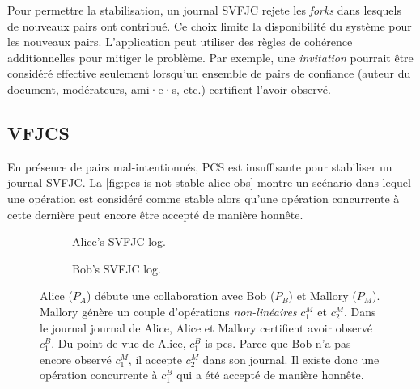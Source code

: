 Pour permettre la stabilisation, un journal \ac{SVFJC} rejete les \emph{forks} dans lesquels de nouveaux pairs ont contribué.
Ce choix limite la disponibilité du système pour les nouveaux pairs.
L'application peut utiliser des règles de cohérence additionnelles pour mitiger le problème.
Par exemple, une \emph{invitation} pourrait être considéré effective seulement lorsqu'un ensemble de pairs de confiance (auteur du document, modérateurs, ami·e·s, etc.) certifient l'avoir observé.

\subsection{\acl{VFJCS}}\label{subsec:vfjcs}

En présence de pairs mal-intentionnés, \acl{PCS} est insuffisante pour stabiliser un journal \ac{SVFJC}.
La \autoref{fig:pcs-is-not-stable-alice-obs} montre un scénario dans lequel une opération est considéré comme stable alors qu'une opération concurrente à cette dernière peut encore être accepté de manière honnête.

\begin{figure}[ht]
  \centering
  \begin{subfigure}{\linewidth}
    \centering
    \begin{utikzhbgraph}
    \end{utikzhbgraph}
    \caption{Alice's \acs{SVFJC} log.}\label{fig:pcs-is-not-stable-alice-obs}
  \end{subfigure}
  \begin{subfigure}{\linewidth}
    \centering
    \begin{utikzhbgraph}
    \end{utikzhbgraph}
    \caption{Bob's \acs{SVFJC} log.}\label{fig:pcs-is-not-stable-bob-obs}
  \end{subfigure}%
  \caption{
  Alice ($P_A$) débute une collaboration avec Bob ($P_B$) et Mallory ($P_M$).
  Mallory génère un couple d'opérations \emph{non-linéaires} $c^M_1$ et $c^M_2$.
   Dans le journal journal de Alice, Alice et Mallory certifient avoir observé $c^B_1$.
  Du point de vue de Alice, $c^B_1$ is \acf{pcs}.
   Parce que Bob n'a pas encore observé $c^M_1$, il accepte $c^M_2$ dans son journal.
  Il existe donc une opération concurrente à $c^B_1$ qui a été accepté de manière honnête.}\label{fig:pcs-is-not-stable}
\end{figure}

